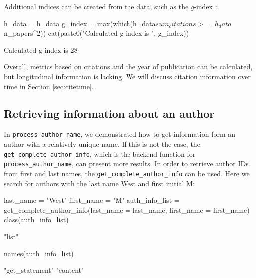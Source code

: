 Additional indices can be created from the data, such as the
\emph{g}-index \citep{egghe2006theory}:

\begin{Schunk}
\begin{Sinput}
h_data = h_data %
g_index = max(which(h_data$sum_citations >= h_data$n_papers^2))
cat(paste0("Calculated g-index is ", g_index))
\end{Sinput}
\begin{Soutput}
Calculated g-index is 28
\end{Soutput}
\end{Schunk}

Overall, metrics based on citations and the year of publication can be
calculated, but longitudinal information is lacking. We will discuss
citation information over time in Section \ref{sec:citetime}.

\hypertarget{retrieving-information-about-an-author}{%
\subsection{Retrieving information about an
author}\label{retrieving-information-about-an-author}}

In \texttt{process\_author\_name}, we demonstrated how to get
information form an author with a relatively unique name. If this is not
the case, the \texttt{get\_complete\_author\_info}, which is the backend
function for \texttt{process\_author\_name}, can present more results.
In order to retrieve author IDs from first and last names, the
\texttt{get\_complete\_author\_info} can be used. Here we search for
authors with the last name West and first initial M:

\begin{Schunk}
\begin{Sinput}
last_name = "West"
first_name = "M"
auth_info_list = get_complete_author_info(last_name = last_name, first_name = first_name)
class(auth_info_list)
\end{Sinput}
\begin{Soutput}
[1] "list"
\end{Soutput}
\begin{Sinput}
names(auth_info_list)
\end{Sinput}
\begin{Soutput}
[1] "get_statement" "content"      
\end{Soutput}
\end{Schunk}

